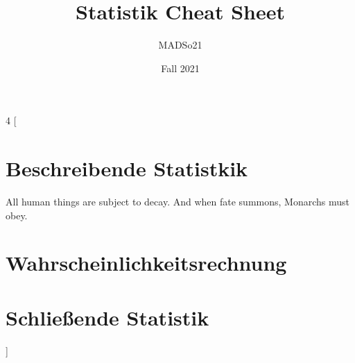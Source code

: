 \documentclass[a4paper]{article}
\title{Statistik Cheat Sheet}
\author{MADSo21}
\date{Fall 2021}
\begin{document}
\begin{landscape}
    \begin{multicols}{4}
    [
    \section{Beschreibende Statistkik}
    All human things are subject to decay. And when fate summons, Monarchs must obey.
    \section{Wahrscheinlichkeitsrechnung}
    \section{Schließende Statistik}
    ]
    
    \end{multicols}
\end{landscape}
\end{document}
